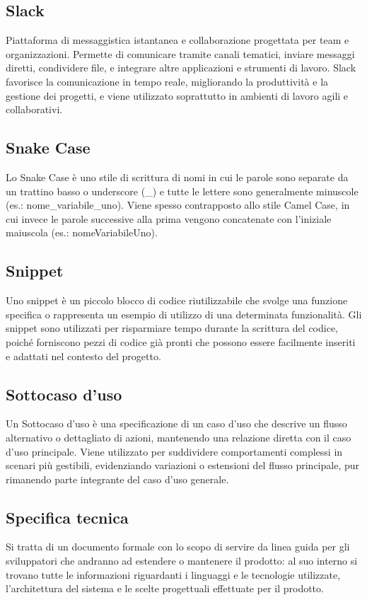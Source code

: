 \hypertarget{sec:slack}{}
\subsection*{Slack}
Piattaforma di messaggistica istantanea e collaborazione progettata per team e organizzazioni. Permette di comunicare tramite canali tematici, inviare 
messaggi diretti, condividere file, e integrare altre applicazioni e strumenti di lavoro. Slack favorisce la comunicazione in tempo reale, migliorando 
la produttività e la gestione dei progetti, e viene utilizzato soprattutto in ambienti di lavoro agili e collaborativi.

\hypertarget{sec:snake_case}{}
\subsection*{Snake Case}
Lo Snake Case è uno stile di scrittura di nomi in cui le parole sono separate da un trattino basso o underscore (\_) e tutte le lettere sono generalmente 
minuscole (es.: nome\_variabile\_uno). Viene spesso contrapposto allo stile Camel Case, in cui invece le parole successive alla prima vengono concatenate 
con l’iniziale maiuscola (es.: nomeVariabileUno).

\hypertarget{sec:snippet}{}
\subsection*{Snippet}
Uno snippet è un piccolo blocco di codice riutilizzabile che svolge una funzione specifica o rappresenta un esempio di utilizzo di una determinata 
funzionalità. Gli snippet sono utilizzati per risparmiare tempo durante la scrittura del codice, poiché forniscono pezzi di codice già pronti che possono 
essere facilmente inseriti e adattati nel contesto del progetto.

\hypertarget{sec:sottocaso_d'uso}{}
\subsection*{Sottocaso d'uso}
Un Sottocaso d'uso è una specificazione di un caso d'uso che descrive un flusso alternativo o dettagliato di azioni, mantenendo una relazione diretta con 
il caso d'uso principale. Viene utilizzato per suddividere comportamenti complessi in scenari più gestibili, evidenziando variazioni o estensioni del 
flusso principale, pur rimanendo parte integrante del caso d'uso generale.

\hypertarget{sec:specifica_tecnica}{}
\subsection*{Specifica tecnica}
Si tratta di un documento formale con lo scopo di servire da linea guida per gli sviluppatori che andranno ad estendere o mantenere 
il prodotto: al suo interno si trovano tutte le informazioni riguardanti i linguaggi e le tecnologie utilizzate, l’architettura del 
sistema e le scelte progettuali effettuate per il prodotto.

